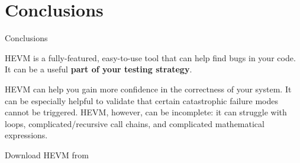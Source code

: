 \documentclass{beamer}
\begin{document}
\section{Conclusions}
\begin{frame}{Conclusions}

HEVM is a fully-featured, easy-to-use tool that can help find bugs in your code. It can be a useful \textbf{part of your testing strategy}.
\bigskip

HEVM can help you gain more confidence in the correctness of your system. It can be especially helpful to validate that certain catastrophic failure modes cannot be triggered. HEVM, however, can be incomplete: it can struggle with loops, complicated/recursive call chains, and complicated mathematical expressions.
\bigskip

Download HEVM from
\smallskip


\end{frame}
\end{document}
